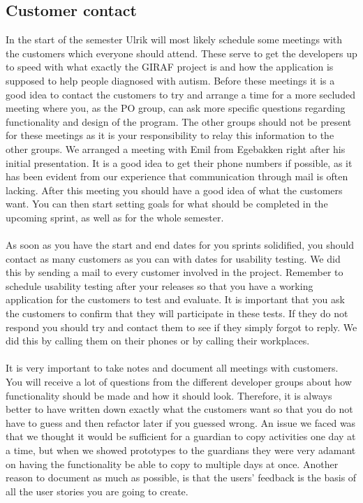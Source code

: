 \subsection{Customer contact}
In the start of the semester Ulrik will most likely schedule some meetings with the customers which everyone should attend.
These serve to get the developers up to speed with what exactly the GIRAF project is and how the application is supposed to help people diagnosed with autism.
Before these meetings it is a good idea to contact the customers to try and arrange a time for a more secluded meeting where you, as the PO group, can ask more specific questions regarding functionality and design of the program.
The other groups should not be present for these meetings as it is your responsibility to relay this information to the other groups.
We arranged a meeting with Emil from Egebakken right after his initial presentation.
It is a good idea to get their phone numbers if possible, as it has been evident from our experience that communication through mail is often lacking.
After this meeting you should have a good idea of what the customers want.
You can then start setting goals for what should be completed in the upcoming sprint, as well as for the whole semester.
\\\\
As soon as you have the start and end dates for you sprints solidified, you should contact as many customers as you can with dates for usability testing. 
We did this by sending a mail to every customer involved in the project.
Remember to schedule usability testing after your releases so that you have a working application for the customers to test and evaluate.
It is important that you ask the customers to confirm that they will participate in these tests.
If they do not respond you should try and contact them to see if they simply forgot to reply.
We did this by calling them on their phones or by calling their workplaces.
\\\\
It is very important to take notes and document all meetings with customers.
You will receive a lot of questions from the different developer groups about how functionality should be made and how it should look.
Therefore, it is always better to have written down exactly what the customers want so that you do not have to guess and then refactor later if you guessed wrong.
An issue we faced was that we thought it would be sufficient for a guardian to copy activities one day at a time, but when we showed prototypes to the guardians they were very adamant on having the functionality be able to copy to multiple days at once.
Another reason to document as much as possible, is that the users' feedback is the basis of all the user stories you are going to create.

